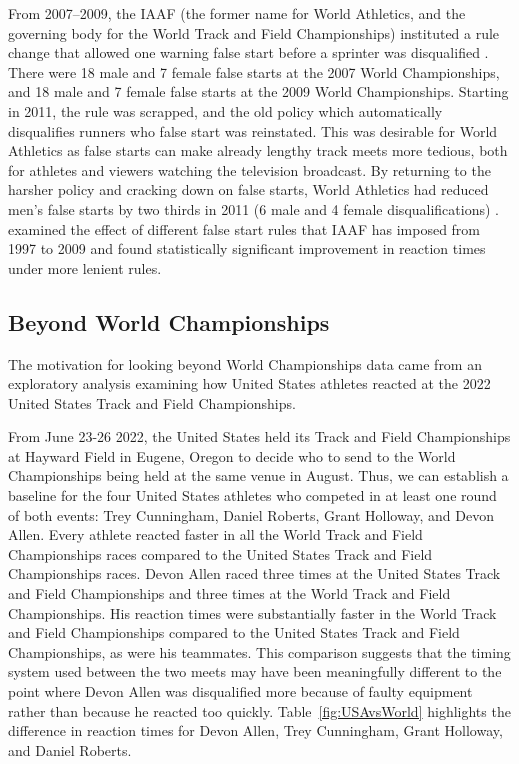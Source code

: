 \documentclass[12pt, letterpaper, titlepage]{article}
\begin{document}
From 2007--2009, the IAAF (the former name for World Athletics, and the 
governing body for the World Track and Field Championships) instituted a rule 
change that allowed one warning false start before a sprinter was disqualified 
\citep{iaaf2009falsestart}. There were 18 male and 7 female false starts at the 
2007 World Championships, and 18 male and 7 female false starts at the 2009 World 
Championships. Starting in 2011, the rule was scrapped, and the old policy which
automatically disqualifies runners who false start was reinstated. This was 
desirable for World Athletics as false starts can make already lengthy track 
meets more tedious, both for athletes and viewers watching the television 
broadcast. By returning to the harsher policy and cracking down on false starts,
World Athletics had reduced men's false starts by two thirds in 2011 (6 male and
4 female disqualifications) \citep{iaaf2009falsestart}. \citet{haugen2013effect}
examined the effect of different false start rules that IAAF has imposed from 
1997 to 2009 and found statistically significant improvement in reaction times 
under more lenient rules.




\subsection{Beyond World Championships}\label{sec:databeyond}
The motivation for looking beyond World Championships data came from an 
exploratory analysis examining how United States athletes reacted at the 
2022 United States Track and Field Championships.

From June 23-26 2022, the United States held its Track and Field Championships 
at Hayward Field in Eugene, Oregon to decide who to send to the World Championships 
being held at the same venue in August. Thus, we can establish a baseline for the four United States athletes who 
competed in at least one round of both events: Trey Cunningham, Daniel Roberts, 
Grant Holloway, and Devon Allen. Every athlete reacted faster in all the World 
Track and Field Championships races compared to the United States Track and Field 
Championships races. Devon Allen raced three times at the United States Track and
Field Championships and three times at the World Track and Field Championships. 
His reaction times were substantially faster in the World Track and
Field Championships compared to the United States Track and Field Championships, 
as were his
teammates. 
This comparison suggests that the timing system used between the two
meets may have been meaningfully different to the point where Devon Allen was
disqualified more because of faulty equipment rather than because he reacted
too quickly.  Table~\ref{fig:USAvsWorld} highlights the difference in reaction 
times for Devon Allen, Trey Cunningham, Grant Holloway, and Daniel Roberts. 
\end{document}
